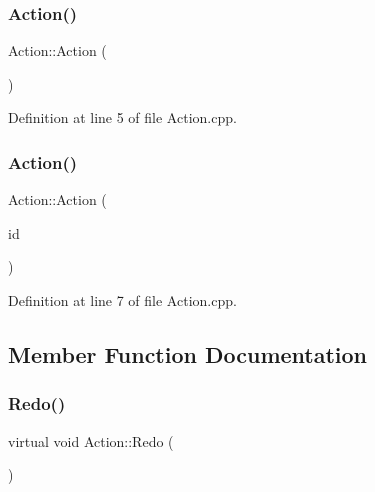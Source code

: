 \subsubsection{\texorpdfstring{Action()}{Action()}\hspace{0.1cm}{\footnotesize\ttfamily [1/2]}}
{\footnotesize\ttfamily Action\+::\+Action (\begin{DoxyParamCaption}{ }\end{DoxyParamCaption})}



Definition at line 5 of file Action.\+cpp.

\mbox{\label{class_action_ab361b73e8653f33eee6b13b76d77bc62}} 
\subsubsection{\texorpdfstring{Action()}{Action()}\hspace{0.1cm}{\footnotesize\ttfamily [2/2]}}
{\footnotesize\ttfamily Action\+::\+Action (\begin{DoxyParamCaption}\item[{\hyperlink{_graphical_element_8h_ade5fd6c85839a416577ff9de1605141e}{Element\+Key}}]{id }\end{DoxyParamCaption})}



Definition at line 7 of file Action.\+cpp.



\subsection{Member Function Documentation}
\mbox{\label{class_action_a69864cea344385ee84a5120eaab5d82a}} 
\subsubsection{\texorpdfstring{Redo()}{Redo()}}
{\footnotesize\ttfamily virtual void Action\+::\+Redo (\begin{DoxyParamCaption}{ }\end{DoxyParamCaption})\hspace{0.3cm}{\ttfamily [pure virtual]}}



